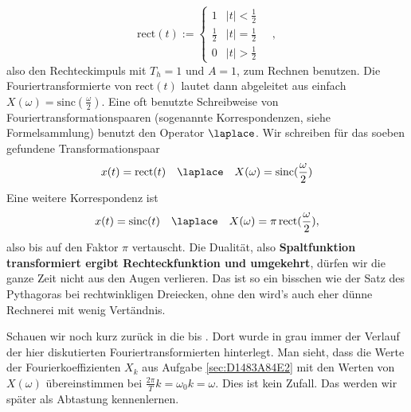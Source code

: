 \begin{Loesung}
\begin{equation}
\text{rect}(t) := \begin{cases} 1 & |t| < \frac{1}{2} \\ \frac{1}{2} & |t| = \frac{1}{2} \\ 0 & |t| > \frac{1}{2} \end{cases}\quad,
\end{equation}
also den Rechteckimpuls mit $T_h=1$ und $A=1$, zum Rechnen benutzen.
%
Die Fouriertransformierte von $\text{rect}(t)$ lautet dann abgeleitet aus
 einfach
$X(\omega) = \mathrm{sinc}(\frac{\omega}{2})$.
%
Eine oft benutzte Schreibweise von Fouriertransformationspaaren (sogenannte
Korrespondenzen, siehe Formelsammlung) benutzt den Operator $\laplace$.
%
Wir schreiben für das soeben gefundene Transformationspaar
\begin{equation}
x(t) = \text{rect}(t) \quad \laplace \quad X(\omega) = \mathrm{sinc}(\frac{\omega}{2})
\end{equation}
%
Eine weitere Korrespondenz ist
\begin{equation}
x(t) = \text{sinc}(t) \quad \laplace \quad X(\omega) = \pi \, \mathrm{rect}(\frac{\omega}{2}),
\end{equation}
also bis auf den Faktor $\pi$ vertauscht.
%
Die Dualität, also \textbf{Spaltfunktion transformiert ergibt Rechteckfunktion und umgekehrt},
dürfen wir die ganze Zeit nicht aus den Augen verlieren. Das ist so ein bisschen
wie der Satz des Pythagoras bei rechtwinkligen Dreiecken, ohne den wird's auch eher
dünne Rechnerei mit wenig Vertändnis.

Schauen wir noch kurz zurück in die  bis .
Dort wurde in grau immer der Verlauf der hier diskutierten Fouriertransformierten
hinterlegt. Man sieht, dass die Werte der Fourierkoeffizienten $X_k$
 aus Aufgabe \ref{sec:D1483A84E2}
mit den Werten von $X(\omega)$  übereinstimmen bei
$\frac{2\pi}{T} k = \omega_0 k = \omega$.
Dies ist kein Zufall. Das werden wir später als Abtastung kennenlernen.



\end{Loesung}

